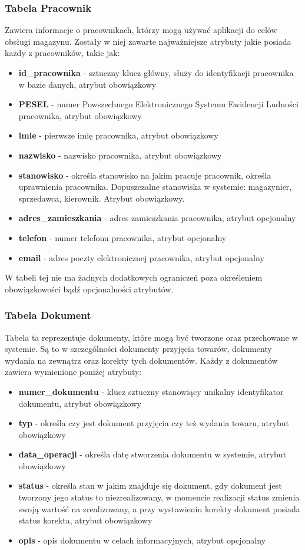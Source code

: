 \subsubsection{Tabela Pracownik}
Zawiera informacje o pracownikach, którzy mogą używać aplikacji do celów obsługi
magazynu. Zostały w niej zawarte najważniejsze atrybuty jakie posiada każdy z
pracowników, takie jak:
\begin{itemize}
  \item \textbf{id\_pracownika} - sztuczny klucz główny, służy do identyfikacji
  pracownika w bazie danych, atrybut obowiązkowy
  \item \textbf{PESEL} - numer Powszechnego Elektronicznego Systemu Ewidencji
  Ludności pracownika, atrybut obowiązkowy
  \item \textbf{imie} - pierwsze imię pracownika, atrybut obowiązkowy
  \item \textbf{nazwisko} - nazwisko pracownika, atrybut obowiązkowy
  \item \textbf{stanowisko} - określa stanowisko na jakim pracuje pracownik,
  określa uprawnienia pracownika. Dopuszczalne stanowiska w systemie: magazynier,
  sprzedawca, kierownik. Atrybut obowiązkowy.
  \item \textbf{adres\_zamieszkania} - adres zamieszkania pracownika, atrybut
  opcjonalny
  \item \textbf{telefon} - numer telefonu pracownika, atrybut opcjonalny
  \item \textbf{email} - adres poczty elektronicznej pracownika, atrybut
  opcjonalny
\end{itemize}

W tabeli tej nie ma żadnych dodatkowych ograniczeń poza określeniem
obowiązkowości bądź opcjonalności atrybutów.

\subsubsection{Tabela Dokument}
Tabela ta reprezentuje dokumenty, które mogą być tworzone oraz przechowane w
systemie. Są to w szczególności dokumenty przyjęcia towarów, dokumenty wydania
na zewnątrz oraz korekty tych dokumentów. Każdy z dokumentów zawiera wymienione
poniżej atrybuty:
\begin{itemize}
  \item \textbf{numer\_dokumentu} - klucz sztuczny stanowiący unikalny
  identyfikator dokumentu, atrybut obowiązkowy
  \item \textbf{typ} - określa czy jest dokument przyjęcia czy też wydania
  towaru, atrybut obowiązkowy
  \item \textbf{data\_operacji} - określa datę stworzenia dokumentu w systemie,
  atrybut obowiązkowy
  \item \textbf{status} - określa stan w jakim znajduje się dokument, gdy
  dokument jest tworzony jego status to niezrealizowany, w momencie realizacji
  status zmienia swoją wartość na zrealizowany, a przy wystawieniu korekty
  dokument posiada status korekta, atrybut obowiązkowy
  \item \textbf{opis} - opis dokumentu w celach informacyjnych, atrybut
  opcjonalny
\end{itemize}

